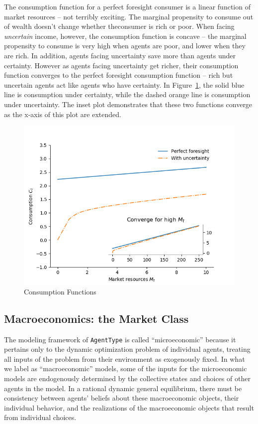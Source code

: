 \message{ !name(ccarroll_et_al_scipy_2018.tex)}\documentclass[10pt,twocolumn]{article}
\begin{document}
The consumption function for a perfect foresight consumer is a linear
function of market resources -- not terribly exciting. The marginal
propensity to consume out of wealth doesn't change whether theconsumer
is rich or poor. When facing \emph{uncertain} income, however, the
consumption function is concave -- the marginal propensity to consume is
very high when agents are poor, and lower when they are rich. In
addition, agents facing uncertainty save more than agents under
certainty. However as agents facing uncertainty get richer, their
consumption function converges to the perfect foresight consumption
function -- rich but uncertain agents act like agents who have
certainty. In \mbox{Figure \ref{fig:consumption-functions}}, the solid
blue line is consumption under certainty, while the dashed orange line
is consumption under uncertainty. The inset plot demonstrates that these
two functions converge as the x-axis of this plot are extended.

\begin{figure}
\centering
\includegraphics{./consumption_functions.png}
\caption{Consumption Functions\label{fig:consumption-functions}}
\end{figure}

\subsection{Macroeconomics: the Market
Class}\label{macroeconomics-the-market-class}

The modeling framework of \texttt{AgentType} is called ``microeconomic''
because it pertains only to the dynamic optimization problem of
individual agents, treating all inputs of the problem from their
environment as exogenously fixed. In what we label as ``macroeconomic''
models, some of the inputs for the microeconomic models are endogenously
determined by the collective states and choices of other agents in the
model. In a rational dynamic general equilibrium, there must be
consistency between agents' beliefs about these macroeconomic objects,
their individual behavior, and the realizations of the macroeconomic
objects that result from individual choices.
\end{document}
